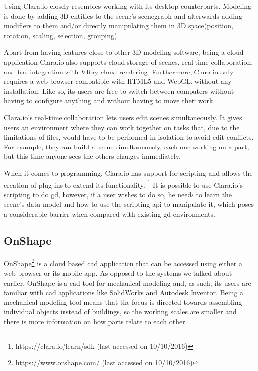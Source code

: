 Using Clara.io closely resembles working with its desktop counterparts.
Modeling is done by adding 3D entities to the scene's scenegraph and afterwards adding modifiers to them and/or directly manipulating them in 3D space(position, rotation, scaling, selection, grouping).

Apart from having features close to other 3D modeling software, being a cloud application Clara.io also supports cloud storage of scenes, real-time collaboration, and has integration with VRay cloud rendering.
Furthermore, Clara.io only requires a web browser compatible with HTML5 and WebGL, without any installation.
Like so, its users are free to switch between computers without having to configure anything and without having to move their work.

Clara.io's real-time collaboration lets users edit scenes simultaneously.
It gives users an environment where they can work together on tasks that, due to the limitations of files, would have to be performed in isolation to avoid edit conflicts.
For example, they can build a scene simultaneously, each one working on a part, but this time anyone sees the others changes immediately.

When it comes to programming, Clara.io has support for scripting and allows the creation of plug-ins to extend its functionality.%
\footnote{https://clara.io/learn/sdk (last accessed on 10/10/2016)}
It is possible to use Clara.io's scripting to do \gls{gd}, however, if a user wishes to do so, he needs to learn the scene's data model and how to use the scripting \gls{api} to manipulate it, which poses a considerable barrier when compared with existing \gls{gd} environments.


\subsection{OnShape}
OnShape\footnote{https://www.onshape.com/ (last accessed on 10/10/2016)} is a cloud based \gls{cad} application that can be accessed using either a web browser or its mobile app.
As opposed to the systems we talked about earlier, OnShape is a \gls{cad} tool for mechanical modeling and, as such, its users are familiar with \gls{cad} applications like SolidWorks and Autodesk Inventor.
Being a mechanical modeling tool means that the focus is directed towards assembling individual objects instead of buildings, so the working scales are smaller and there is more information on how parts relate to each other.

